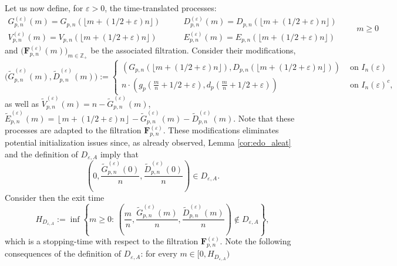 \documentclass[a4, 11pt]{article}
\numberwithin{equation}{section}
\theoremstyle{plain}
\theoremstyle{definition}
\theoremstyle{remark}
\begin{document}
Let us now define, for $\varepsilon>0$, the time-translated processes:
\begin{equation*}
\begin{array}{ll}
G_{p,n}^{(\varepsilon)}(m) =G_{p,n}(\lfloor m+(1/2+\varepsilon) n\rfloor) & \qquad D_{p,n}^{(\varepsilon)}(m)=D_{p,n}(\lfloor m+(1/2+\varepsilon) n\rfloor) \\
V_{p,n}^{(\varepsilon)}(m)=V_{p,n}(\lfloor m+(1/2+\varepsilon) n\rfloor) & \qquad E_{p,n}^{(\varepsilon)}(m)=E_{p,n}(\lfloor m+(1/2+\varepsilon) n\rfloor)
\end{array}
\qquad m \geq 0
\end{equation*}
and $\big({\mathbf{F}}^{(\varepsilon)}_{p,n}(m)\big)_{m\in \mathbb Z_+}$ be the associated filtration.
Consider their modifications, 
	\begin{equation*}\label{def:X_tilde}
		\Big(\tilde{G}^{(\varepsilon)}_{p,n}(m),\tilde{D}^{(\varepsilon)}_{p,n}(m)\Big):=
		\left\{
		\begin{array}{ll}
		\left(G_{p,n}(\lfloor m+(1/2+\varepsilon) n\rfloor),D_{p,n}(\lfloor m+(1/2+\varepsilon) n\rfloor)\right) & \text{ on } I_n(\varepsilon)\\
			n\cdot\left(g_p\left(\frac{m}{n}+1/2+\varepsilon\right),d_p\left(\frac{m}{n}+1/2+\varepsilon\right)\right)&\text{ on } I_n(\varepsilon)^c,
		\end{array}
		\right.
	\end{equation*} 
as well as $\tilde{V}^{(\varepsilon)}_{p,n}(m)=n-\tilde{G}^{(\varepsilon)}_{p,n}(m)$, $\tilde{E}^{(\varepsilon)}_{p,n}(m)= \left\lfloor m+(1/2+\varepsilon)n \right\rfloor -\tilde{G}^{(\varepsilon)}_{p,n}(m)-\tilde{D}^{(\varepsilon)}_{p,n}(m)$. Note that these processes are adapted to the filtration ${\mathbf{F}}^{(\varepsilon)}_{p,n}$. These modifications eliminates potential initialization issues since, as already observed, Lemma \ref{cor:edo_aleat} and the definition of $D_{\varepsilon,A}$ imply that $$\left(0, \frac{\tilde{G}^{(\varepsilon)}_{p,n}(0)}{n},\frac{\tilde{D}^{(\varepsilon)}_{p,n}(0)}{n}\right)\in D_{\varepsilon,A}.$$
Consider then the exit time 
\begin{equation}
\label{def:exittime} 
H_{D_{\varepsilon,A}}:=\inf\left\{m\geq 0:\, \left(\frac{m}{n},\frac{\tilde{G}^{(\varepsilon)}_{p,n}(m)}{n},\frac{\tilde{D}^{(\varepsilon)}_{p,n}(m)}{n}\right)\notin D_{\varepsilon,A}  \right\},
\end{equation}
which is a stopping-time with respect to the filtration ${\mathbf F}^{(\varepsilon)}_{p,n}$.
Note the following consequences of the definition of $D_{\varepsilon,A}$: for every $m \in \big[0 ,H_{D_{\varepsilon,A}} \big)$ 
\end{document}
